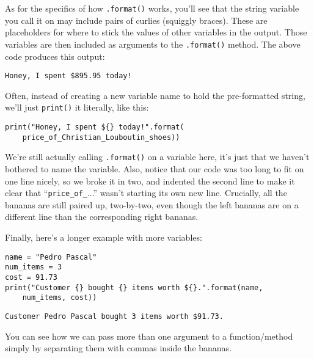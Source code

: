 As for the specifics of how \texttt{.format()} works, you'll see that the
string variable you call it on may include pairs of curlies (squiggly braces).
These are placeholders for where to stick the values of other variables in the
output. Those variables are then included as arguments to the
\texttt{.format()} method. The above code produces this output:

\begin{Verbatim}[fontsize=\small,samepage=true,frame=leftline,framesep=5mm,framerule=1mm]
Honey, I spent $895.95 today!
\end{Verbatim}

Often, instead of creating a new variable name to hold the pre-formatted
string, we'll just \texttt{print()} it literally, like this:

\begin{Verbatim}[fontsize=\footnotesize,samepage=true,frame=single,framesep=3mm]
print("Honey, I spent ${} today!".format(
    price_of_Christian_Louboutin_shoes))
\end{Verbatim}

We're still actually calling \texttt{.format()} on a variable here, it's just
that we haven't bothered to name the variable. Also, notice that our code was
too long to fit on one line nicely, so we broke it in two, and indented the
second line to make it clear that ``\texttt{price\_of\_}...'' wasn't starting
its own new line. Crucially, all the bananas are still paired up, two-by-two,
even though the left bananas are on a different line than the corresponding
right bananas.

\bigskip
Finally, here's a longer example with more variables:

\begin{Verbatim}[fontsize=\footnotesize,samepage=true,frame=single,framesep=3mm]
name = "Pedro Pascal"
num_items = 3
cost = 91.73
print("Customer {} bought {} items worth ${}.".format(name,
    num_items, cost))
\end{Verbatim}

\begin{Verbatim}[fontsize=\small,samepage=true,frame=leftline,framesep=5mm,framerule=1mm]
Customer Pedro Pascal bought 3 items worth $91.73.
\end{Verbatim}

You can see how we can pass more than one argument to a function/method simply
by separating them with commas inside the bananas.
